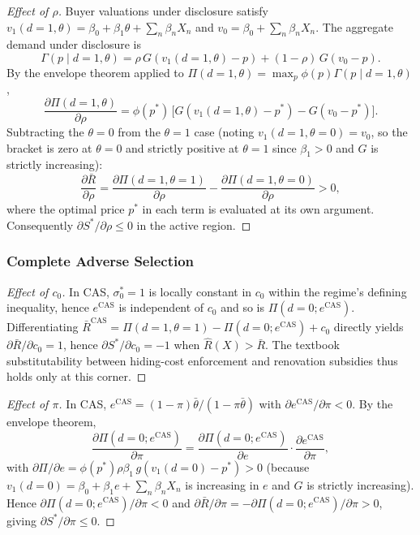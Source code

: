 \documentclass[10pt,letterpaper]{bp-template-concise}
\begin{document}
\begin{proof}[Effect of $\rho$]
Buyer valuations under disclosure satisfy $v_1(d=1,\theta) = \beta_0 + \beta_1 \theta + \sum_n \beta_n X_n$ and $v_0 = \beta_0 + \sum_n \beta_n X_n$. The aggregate demand under disclosure is
\begin{equation*}
    \Gamma(p \mid d=1, \theta) = \rho\, G(v_1(d=1,\theta)-p) + (1-\rho)\, G(v_0 - p).
\end{equation*}
By the envelope theorem applied to $\Pi(d=1,\theta) = \max_p \phi(p)\Gamma(p\mid d=1,\theta)$,
\begin{equation*}
    \frac{\partial \Pi(d=1,\theta)}{\partial \rho} = \phi(p^*)\, \big[G(v_1(d=1,\theta)-p^*) - G(v_0-p^*)\big].
\end{equation*}
Subtracting the $\theta=0$ from the $\theta=1$ case (noting $v_1(d=1,\theta=0) = v_0$, so the bracket is zero at $\theta=0$ and strictly positive at $\theta=1$ since $\beta_1>0$ and $G$ is strictly increasing):
\begin{equation*}
    \frac{\partial \bar R}{\partial \rho} = \frac{\partial \Pi(d=1,\theta=1)}{\partial \rho} - \frac{\partial \Pi(d=1,\theta=0)}{\partial \rho} > 0,
\end{equation*}
where the optimal price $p^*$ in each term is evaluated at its own argument. Consequently $\partial S^*/\partial \rho \leq 0$ in the active region.
\end{proof}

\subsubsection*{Complete Adverse Selection}

\begin{proof}[Effect of $c_0$]
In CAS, $\sigma_0^* = 1$ is locally constant in $c_0$ within the regime's defining inequality, hence $e^{\text{CAS}}$ is independent of $c_0$ and so is $\Pi(d=0;e^{\text{CAS}})$. Differentiating $\bar R^{\text{CAS}} = \Pi(d=1,\theta=1) - \Pi(d=0;e^{\text{CAS}}) + c_0$ directly yields $\partial \bar R/\partial c_0 = 1$, hence $\partial S^*/\partial c_0 = -1$ when $\hat R(X) > \bar R$. The textbook substitutability between hiding-cost enforcement and renovation subsidies thus holds only at this corner.
\end{proof}

\begin{proof}[Effect of $\pi$]
In CAS, $e^{\text{CAS}} = (1-\pi)\bar\theta/(1-\pi\bar\theta)$ with $\partial e^{\text{CAS}}/\partial \pi < 0$. By the envelope theorem,
\begin{equation*}
    \frac{\partial \Pi(d=0;e^{\text{CAS}})}{\partial \pi} = \frac{\partial \Pi(d=0;e^{\text{CAS}})}{\partial e} \cdot \frac{\partial e^{\text{CAS}}}{\partial \pi},
\end{equation*}
with $\partial \Pi/\partial e = \phi(p^*)\rho\beta_1\, g(v_1(d=0) - p^*) > 0$ (because $v_1(d=0)=\beta_0+\beta_1 e+\sum_n\beta_n X_n$ is increasing in $e$ and $G$ is strictly increasing). Hence $\partial \Pi(d=0;e^{\text{CAS}})/\partial \pi < 0$ and $\partial \bar R/\partial \pi = -\partial \Pi(d=0;e^{\text{CAS}})/\partial \pi > 0$, giving $\partial S^*/\partial \pi \leq 0$.
\end{proof}
\end{document}
